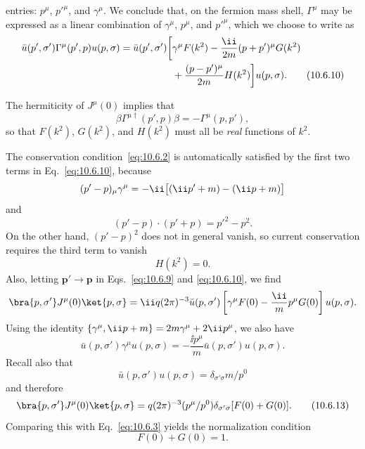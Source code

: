 entries: $p^\mu$, $p'^\mu$, and $\gamma^\mu$. We conclude that, on the fermion
mass shell, $\Gamma^\mu$ may be expressed as a linear combination of
$\gamma^\mu$, $p^\mu$, and $p'^\mu$, which we choose to write as
\begin{align}
  \bar u(p',\sigma')\Gamma^\mu(p',p)u(p,\sigma)
  =\bar u(p',\sigma')\biggl[
  &\gamma^\mu F(k^2)-\frac{\ii}{2m}(p+p')^\mu G(k^2) \notag\\
  &+\frac{(p-p')^\mu}{2m}H(k^2)\biggr]u(p,\sigma).
  \tag{10.6.10}\label{eq:10.6.10}
\end{align}

The hermiticity of $J^\mu(0)$ implies that
\begin{equation}
  \beta\Gamma^{\mu\dagger}(p',p)\beta=-\Gamma^\mu(p,p'),
  \tag{10.6.11}\label{eq:10.6.11}
\end{equation}
so that $F(k^2)$, $G(k^2)$, and $H(k^2)$ must all be \emph{real} functions of
$k^2$.

The conservation condition~\eqref{eq:10.6.2} is automatically satisfied by
the first two terms in Eq.~\eqref{eq:10.6.10}, because
\begin{equation*}
  (p'-p)_\mu\gamma^\mu
  =-\ii\bigl[(\ii\sl{p}'+m)-(\ii\sl{p}+m)\bigr]
\end{equation*}
and
\begin{equation*}
  (p'-p)\cdot(p'+p)=p'^2-p^2.
\end{equation*}
On the other hand, $(p'-p)^2$ does not in general vanish, so current
conservation requires the third term to vanish
\begin{equation}
  H(k^2)=0.
  \tag{10.6.12}\label{eq:10.6.12}
\end{equation}
Also, letting $\mathbf{p}'\to\mathbf{p}$ in Eqs.~\eqref{eq:10.6.9} and
\eqref{eq:10.6.10}, we find
\begin{equation*}
  \bra{p,\sigma'}J^\mu(0)\ket{p,\sigma}
  =\ii q(2\pi)^{-3}\bar u(p,\sigma')
  \left[\gamma^\mu F(0)-\frac{\ii}{m}p^\mu G(0)\right]u(p,\sigma).
\end{equation*}
Using the identity $\{\gamma^\mu,\ii\sl{p}+m\}=2m\gamma^\mu+2\ii p^\mu$,
we also have
\begin{equation*}
  \bar u(p,\sigma')\gamma^\mu u(p,\sigma)
  =-\frac{\ii p^\mu}{m}\bar u(p,\sigma')u(p,\sigma).
\end{equation*}
Recall also that
\begin{equation*}
  \bar u(p,\sigma')u(p,\sigma)=\delta_{\sigma'\sigma}m/p^0
\end{equation*}
and therefore
\begin{equation}
  \bra{p,\sigma'}J^\mu(0)\ket{p,\sigma}
  =q(2\pi)^{-3}(p^\mu/p^0)\delta_{\sigma'\sigma}[F(0)+G(0)].
  \tag{10.6.13}\label{eq:10.6.13}
\end{equation}
Comparing this with Eq.~\eqref{eq:10.6.3} yields the normalization condition
\begin{equation}
  F(0)+G(0)=1.
  \tag{10.6.14}\label{eq:10.6.14}
\end{equation}

